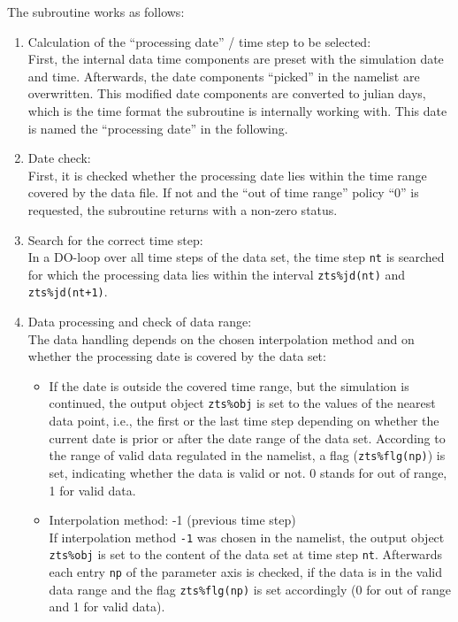 \documentclass[11pt,twoside]{report}
\begin{document}
The subroutine works as follows:
\begin{enumerate}
\item Calculation of the ``processing date'' / time step to be selected:\\
First, the internal data time components are preset with the simulation
date and time. Afterwards, the date components ``picked'' in the namelist are 
overwritten. This modified date components are converted to julian days,
which is the time format the subroutine is internally working with. This date
is named the ``processing date'' in the following.
\item Date check:\\
First, it is checked whether the processing date lies within the time range
covered by the data file. If not and the ``out of time range'' policy
``0'' is requested, the subroutine returns with a non-zero status.
\item Search for the correct time step:\\
In a DO-loop over all time steps of the data set, the time step \verb|nt| is
searched for  which the processing data lies within the interval 
 \verb|zts%jd(nt)| and \verb|zts%jd(nt+1)|.
\item Data processing and check of data range:\\
The data handling depends on the chosen interpolation method and on whether
the processing date is covered by the data set:
\begin{itemize}
\item If the date is outside the covered time range, but the simulation is
continued, the output object \verb|zts%obj| is
set to the values of the nearest data point, i.e., the first or the last 
time step depending on whether the current date is prior or after the
date range of the data set.
 According to the range of valid data regulated in the namelist, a flag 
(\verb|zts%flg(np)|) is set, indicating whether the data is valid or not.
0 stands for out of range, 1 for valid data.
\item Interpolation method: -1 (previous time step)\\
If interpolation method \verb|-1| was chosen in the namelist, the output object
 \verb|zts%obj|
 is set to the content of the data set at time step \verb|nt|.
Afterwards each entry \verb|np| of the parameter axis is checked, if the data
 is in the valid data range and the flag \verb|zts%flg(np)| is set
accordingly (0 for out of range and 1 for valid data).


\end{itemize}
\end{enumerate}
\end{document}
